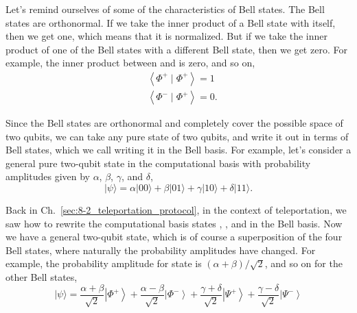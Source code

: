 Let's remind ourselves of some of the characteristics of Bell states.
The Bell states are orthonormal. If we take the inner product of a Bell state with itself, then we get one, which means that it is normalized. But if we take the inner product of one of the Bell states with a different Bell state, then we get zero. For example, the inner product between \ket{\Phi^-} and \ket{\Phi^+} is zero, and so on,
\begin{equation}
\begin{aligned}
&\left\langle\Phi^{+} \mid \Phi^{+}\right\rangle=1 \\
&\left\langle\Phi^{-} \mid \Phi^{+}\right\rangle=0.
\end{aligned}
\end{equation}

Since the Bell states are orthonormal and completely cover the possible space of two qubits, we can take any pure state of two qubits, and write it out in terms of Bell states, which we call writing it in the Bell basis. For example, let's consider a general pure two-qubit state in the computational basis with probability amplitudes given by $\alpha$, $\beta$, $\gamma$, and $\delta$,
\begin{equation}
|\psi\rangle=\alpha|00\rangle+\beta|01\rangle+\gamma|10\rangle+\delta|11\rangle.
\end{equation}

Back in Ch.~\ref{sec:8-2_teleportation_protocol}, in the context of teleportation, we saw how to rewrite the computational basis states , ,  and  in the Bell basis. Now we have a general two-qubit state, which is of course a superposition of the four Bell states, where naturally the probability amplitudes have changed. For example, the probability amplitude for state \ket{\Phi^+} is $(\alpha+\beta)/\sqrt{2}$, and so on for the other Bell states,
\begin{equation}
|\psi\rangle=\frac{\alpha+\beta}{\sqrt{2}}\left|\Phi^{+}\right\rangle+\frac{\alpha-\beta}{\sqrt{2}}\left|\Phi^{-}\right\rangle+\frac{\gamma+\delta}{\sqrt{2}}\left|\Psi^{+}\right\rangle+\frac{\gamma-\delta}{\sqrt{2}}\left|\Psi^{-}\right\rangle
\end{equation}

